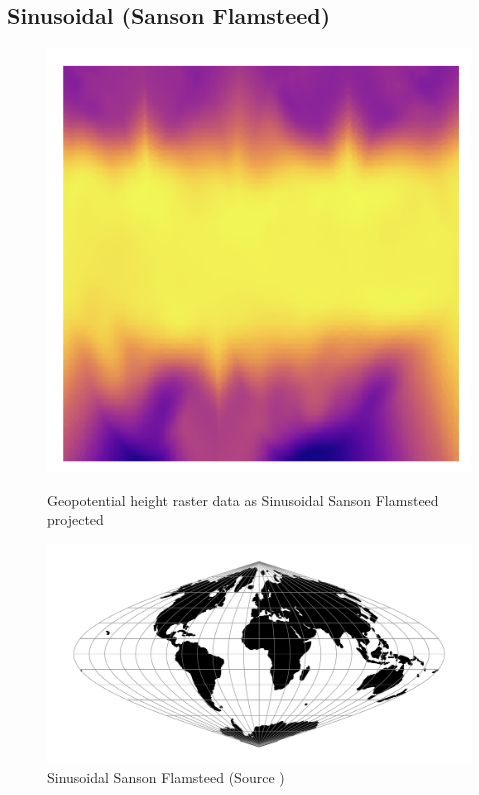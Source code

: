 \subsection{Sinusoidal (Sanson Flamsteed)}
\begin{figure}[H]
    \centering
    \begin{minipage}{0.30\textwidth}
        \centering
        \includegraphics[width=0.9\linewidth]{figures/chapter-8/geopoth_goode.png}
        \caption{ Geopotential height raster data as Sinusoidal Sanson Flamsteed projected}
        \label{fig:sinu_geopoth_raster}
    \end{minipage}\hfill
    \begin{minipage}{0.30\textwidth}
        \centering
        \includegraphics[width=0.9\linewidth]{figures/chapter-8/sinu.png}
        \caption{Sinusoidal Sanson Flamsteed (Source \cite{PROJ_SITE})}

\end{minipage}
\end{figure}
